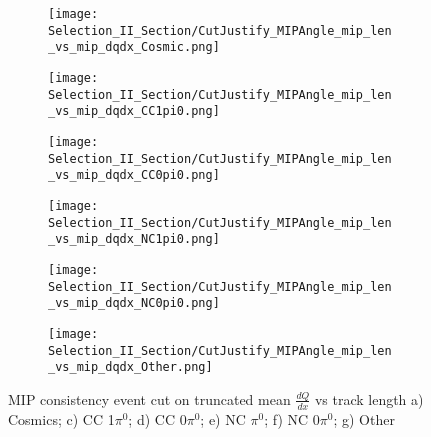 \begin{figure}[H]
\centering
  \begin{subfigure}[t]{0.35\textwidth}
    \centering
\texttt{[image: Selection\_II\_Section/CutJustify\_MIPAngle\_mip\_len\_vs\_mip\_dqdx\_Cosmic.png]}
    \caption{ }
  \end{subfigure} 
  \hspace{10mm}
  \begin{subfigure}[t]{0.35\textwidth}
    \centering
\texttt{[image: Selection\_II\_Section/CutJustify\_MIPAngle\_mip\_len\_vs\_mip\_dqdx\_CC1pi0.png]}
    \caption{ }
  \end{subfigure} 
  \hspace{10mm}
  \begin{subfigure}[t]{0.35\textwidth}
    \centering
\texttt{[image: Selection\_II\_Section/CutJustify\_MIPAngle\_mip\_len\_vs\_mip\_dqdx\_CC0pi0.png]}
    \caption{ }
  \end{subfigure} 
    \hspace{10mm}
  \begin{subfigure}[t]{0.35\textwidth}
    \centering
\texttt{[image: Selection\_II\_Section/CutJustify\_MIPAngle\_mip\_len\_vs\_mip\_dqdx\_NC1pi0.png]}
    \caption{ }
  \end{subfigure} 
  \hspace{10mm}
  \begin{subfigure}[t]{0.35\textwidth}
    \centering
\texttt{[image: Selection\_II\_Section/CutJustify\_MIPAngle\_mip\_len\_vs\_mip\_dqdx\_NC0pi0.png]}
    \caption{ }
  \end{subfigure}
    \hspace{10mm}
  \begin{subfigure}[t]{0.35\textwidth}
    \centering
\texttt{[image: Selection\_II\_Section/CutJustify\_MIPAngle\_mip\_len\_vs\_mip\_dqdx\_Other.png]}
    \caption{ }
  \end{subfigure} 
\caption{ MIP consistency event cut on truncated mean $\frac{dQ}{dx}$ vs track length a) Cosmics; c) CC 1$\pi^0$; d) CC 0$\pi^0$; e) NC $\pi^0$; f) NC 0$\pi^0$; g) Other }
\label{fig:cutjust_mip_2d}
\end{figure}

